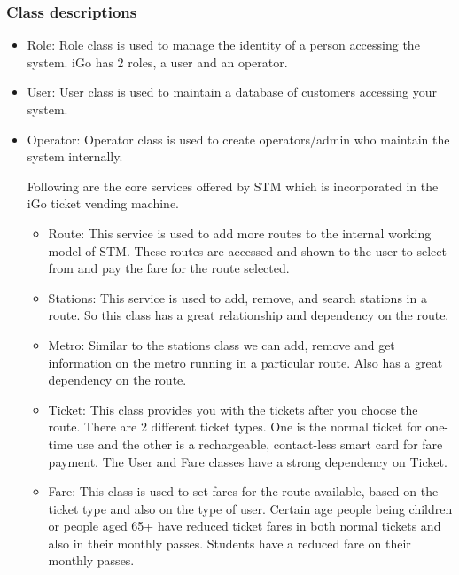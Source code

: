 \documentclass{article}
\begin{document}
\subsubsection{Class descriptions}
\begin{itemize}
    \item Role: Role class is used to manage the identity of a person accessing the system. iGo has 2 roles, a user and an operator.
    \item User: User class is used to maintain a database of customers accessing your system. 
    \item Operator: Operator class is used to create operators/admin who maintain the system internally. 
    
    Following are the core services offered by STM which is incorporated in the iGo ticket vending machine. 
    \begin{itemize}
        \item Route: This service is used to add more routes to the internal working model of STM. These routes are accessed and shown to the user to select from and pay the fare for the route selected. 
        \item Stations: This service is used to add, remove, and search stations in a route. So this class has a great relationship and dependency on the route.
        \item Metro: Similar to the stations class we can add, remove and get information on the metro running in a particular route. Also has a great dependency on the route. 
        \item Ticket: This class provides you with the tickets after you choose the route. There are 2 different ticket types. One is the normal ticket for one-time use and the other is a rechargeable, contact-less smart card for fare payment. The User and Fare classes have a strong dependency on Ticket. 
        \item Fare: This class is used to set fares for the route available, based on the ticket type and also on the type of user. Certain age people being children or people aged 65+ have reduced ticket fares in both normal tickets and also in their monthly passes. Students have a reduced fare on their monthly passes. 
    \end{itemize} 
\end{itemize}
\end{document}
